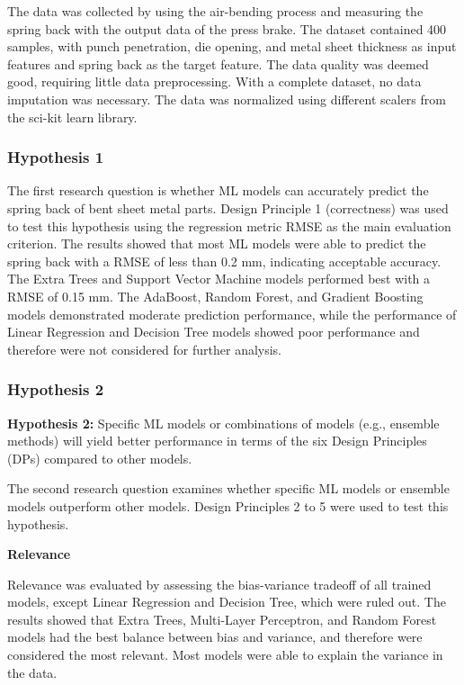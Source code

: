 The data was collected by using the air-bending process and measuring the spring back with the output data of the
press brake.
The dataset contained 400 samples, with punch penetration, die opening, and metal sheet thickness as
input features and spring back as the target feature.
The data quality was deemed good, requiring little data preprocessing.
With a complete dataset, no data imputation was necessary.
The data was normalized using different scalers from the sci-kit learn library.


\subsubsection{Hypothesis 1}

The first research question is whether ML models can accurately predict the spring back of bent sheet metal parts.
Design Principle 1 (correctness) was used to test this hypothesis using the regression metric RMSE as the main
evaluation criterion.
The results showed that most ML models were able to predict the spring back with a RMSE of less
than 0.2 mm, indicating acceptable accuracy.
The Extra Trees and Support Vector Machine models performed best with a RMSE of 0.15 mm.
The AdaBoost, Random Forest, and Gradient Boosting models demonstrated moderate prediction
performance, while the performance of Linear Regression and Decision Tree models showed poor performance and
therefore were not considered for further analysis.

\subsubsection{Hypothesis 2}

\textbf{Hypothesis 2:} Specific ML models or combinations of models (e.g., ensemble methods) will yield better
performance
in terms of the six Design Principles (DPs) compared to other models.

The second research question examines whether specific ML models or ensemble models outperform other models.
Design Principles 2 to 5 were used to test this hypothesis.

\textbf{Relevance}

Relevance was evaluated by assessing the bias-variance tradeoff of all trained models, except Linear Regression and
Decision Tree, which were ruled out.
The results showed that Extra Trees, Multi-Layer Perceptron, and Random Forest models had the best balance between
bias and variance, and therefore were considered the most relevant.
Most models were able to explain the variance in the data.

